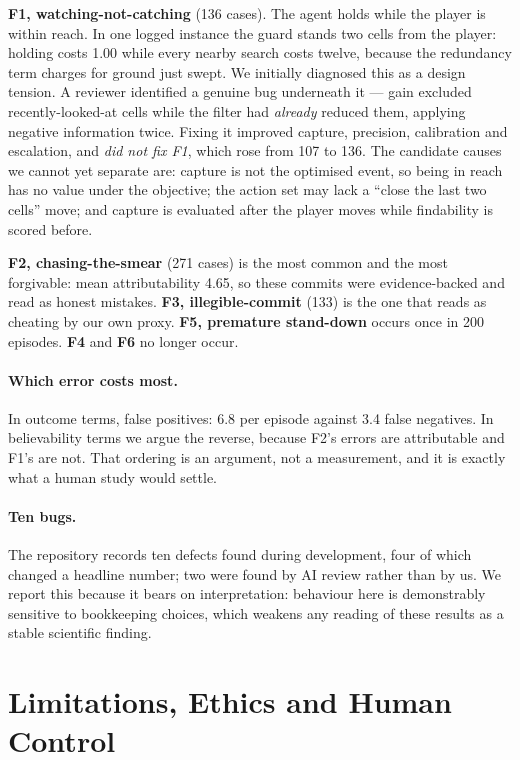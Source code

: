 \documentclass{article}
\begin{document}
\textbf{F1, watching-not-catching} (136 cases). The agent holds while the player is within
reach. In one logged instance the guard stands two cells from the player: holding costs 1.00
while every nearby search costs twelve, because the redundancy term charges for ground just
swept. We initially diagnosed this as a design tension. A reviewer identified a genuine bug
underneath it --- gain excluded recently-looked-at cells while the filter had \emph{already}
reduced them, applying negative information twice. Fixing it improved capture, precision,
calibration and escalation, and \emph{did not fix F1}, which rose from 107 to 136. The
candidate causes we cannot yet separate are: capture is not the optimised event, so being in
reach has no value under the objective; the action set may lack a ``close the last two cells''
move; and capture is evaluated after the player moves while findability is scored before.

\textbf{F2, chasing-the-smear} (271 cases) is the most common and the most forgivable: mean
attributability 4.65, so these commits were evidence-backed and read as honest mistakes.
\textbf{F3, illegible-commit} (133) is the one that reads as cheating by our own proxy.
\textbf{F5, premature stand-down} occurs once in 200 episodes. \textbf{F4} and \textbf{F6} no
longer occur.

\paragraph{Which error costs most.}
In outcome terms, false positives: 6.8 per episode against 3.4 false negatives. In believability
terms we argue the reverse, because F2's errors are attributable and F1's are not. That
ordering is an argument, not a measurement, and it is exactly what a human study would settle.

\paragraph{Ten bugs.}
The repository records ten defects found during development, four of which changed a headline
number; two were found by AI review rather than by us. We report this because it bears on
interpretation: behaviour here is demonstrably sensitive to bookkeeping choices, which weakens
any reading of these results as a stable scientific finding.

\section{Limitations, Ethics and Human Control}
\label{sec:limits}
\end{document}
